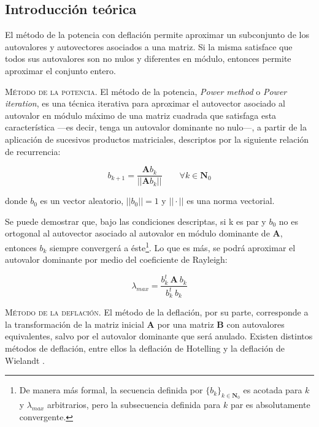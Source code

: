 
\vspace{1em}
\subsection{Introducción teórica} El método de la potencia con deflación permite aproximar un subconjunto de los autovalores y autovectores asociados a una matriz. Si la misma satisface que todos sus autovalores son no nulos y diferentes en módulo, entonces permite aproximar el conjunto entero. 


\vspace{2em}
\noindent \textsc{Método de la potencia}. El método de la potencia, \textit{Power method} o \textit{Power iteration}, es una técnica iterativa para aproximar el autovector asociado al autovalor en módulo máximo de una matriz cuadrada que satisfaga esta característica ---es decir, tenga un autovalor dominante no nulo---, a partir de la aplicación de sucesivos productos matriciales, descriptos por la siguiente relación de recurrencia:

\begin{equation} \label{potencia}
    b_{k+1} = \frac{\mathbf{A}b_k}{||\mathbf{A}b_k||} \qquad \forall k \in \mathbf{N}_0
\end{equation}

\vspace{1em}
\noindent donde $b_0$ es un vector aleatorio, $||b_0|| = 1$ y $|| \cdot ||$ es una norma vectorial.

\vspace{1em}
Se puede demostrar \cite{Burden} que, bajo las condiciones descriptas, si k es par y $b_0$ no es ortogonal al autovector asociado al autovalor en módulo dominante de \textbf{A}, entonces $b_k$ siempre convergerá a éste\footnote{De manera más formal, la secuencia definida por $\{b_k\}_{k \in \mathbf{N}_0}$ es acotada para $k$ y $\lambda_{max}$ arbitrarios, pero la subsecuencia definida para $k$ par es absolutamente convergente.}. Lo que es más, se podrá aproximar el autovalor dominante por medio del coeficiente de Rayleigh:

\vspace{1em}
\begin{equation} \label{rayleigh}
    \lambda_{max} = \frac{b_k^t\ \mathbf{A}\ b_k}{b_k^t\ b_k}
\end{equation}


\vspace{2em}
\noindent \textsc{Método de la deflación}. El método de la deflación, por su parte, corresponde a la transformación de la matriz inicial \textbf{A} por una matriz \textbf{B} con autovalores equivalentes, salvo por el autovalor dominante que será anulado. Existen distintos métodos de deflación, entre ellos la deflación de Hotelling y la deflación de Wielandt \cite{Burden}.  

